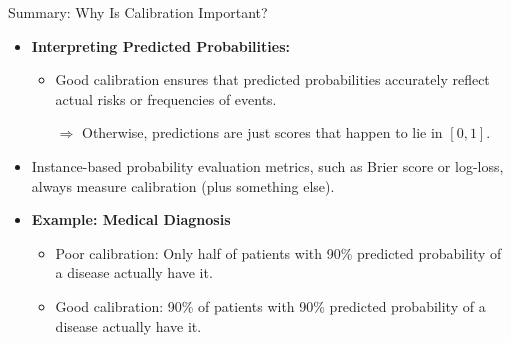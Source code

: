 \documentclass[11pt,compress,t,notes=noshow, xcolor=table]{beamer}
\begin{document}
\begin{frame}{Summary: Why Is Calibration Important?}

    \begin{itemize}
        \item \textbf{Interpreting Predicted Probabilities:}
            \begin{itemize}
                \item Good calibration ensures that predicted probabilities %
                accurately reflect actual risks or frequencies of events.
                \item[$\Rightarrow$] Otherwise, predictions are just scores that happen to lie in $[0,1]$.
            \end{itemize}
        \item Instance-based probability evaluation metrics, such as Brier score or log-loss, always measure calibration (plus something else).
        \item \textbf{Example: Medical Diagnosis}
            \begin{itemize}
                \item Poor calibration: Only half of patients with 90\% predicted probability of a disease actually have it.
                \item Good calibration: 90\% of patients with 90\% predicted probability of a disease actually have it.
            \end{itemize}
    \end{itemize}
\end{frame}

\endlecture
\end{document}
